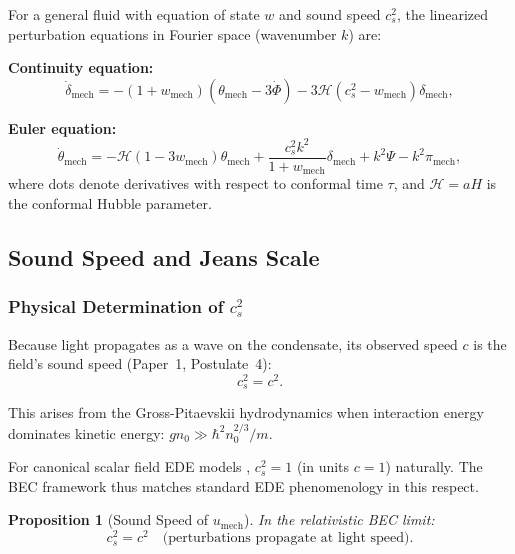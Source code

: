 \documentclass[11pt,a4paper]{article}
\newcommand{\umech}{\ensuremath{u_{\mathrm{mech}}}}
\newcommand{\wmech}{\ensuremath{w_{\mathrm{mech}}}}
\newtheorem{proposition}[theorem]{Proposition}
\theoremstyle{definition}
\theoremstyle{remark}
\begin{document}
For a general fluid with equation of state $w$ and sound speed $c_s^2$, the linearized perturbation equations in Fourier space (wavenumber $k$) are:

\textbf{Continuity equation:}
\begin{equation}
\label{eq:delta_evolution}
\boxed{\dot{\delta}_{\mathrm{mech}} = -(1+\wmech)(\theta_{\mathrm{mech}} - 3\dot{\Phi}) - 3\mathcal{H}(c_s^2 - \wmech)\delta_{\mathrm{mech}},}
\end{equation}

\textbf{Euler equation:}
\begin{equation}
\label{eq:theta_evolution}
\boxed{\dot{\theta}_{\mathrm{mech}} = -\mathcal{H}(1-3\wmech)\theta_{\mathrm{mech}} + \frac{c_s^2 k^2}{1+\wmech}\delta_{\mathrm{mech}} + k^2\Psi - k^2\pi_{\mathrm{mech}},}
\end{equation}
where dots denote derivatives with respect to conformal time $\tau$, and $\mathcal{H} = aH$ is the conformal Hubble parameter.

\subsection{Sound Speed and Jeans Scale}
\label{sec:cs_jeans}

\subsubsection{Physical Determination of $c_s^2$}

Because light propagates as a wave on the condensate, its observed speed $c$ is the field's sound speed (Paper~1, Postulate~4):
\begin{equation}
c_s^2 = c^2.
\end{equation}

This arises from the Gross-Pitaevskii hydrodynamics when interaction energy dominates kinetic energy: $gn_0 \gg \hbar^2 n_0^{2/3}/m$.

For canonical scalar field EDE models \cite{Poulin2019}, $c_s^2 = 1$ (in units $c=1$) naturally. The BEC framework thus matches standard EDE phenomenology in this respect.

\begin{proposition}[Sound Speed of $\umech$]
\label{prop:cs_mech}
In the relativistic BEC limit:
\begin{equation}
\boxed{c_s^2 = c^2 \quad \text{(perturbations propagate at light speed)}.}
\end{equation}
\end{proposition}
\end{document}
